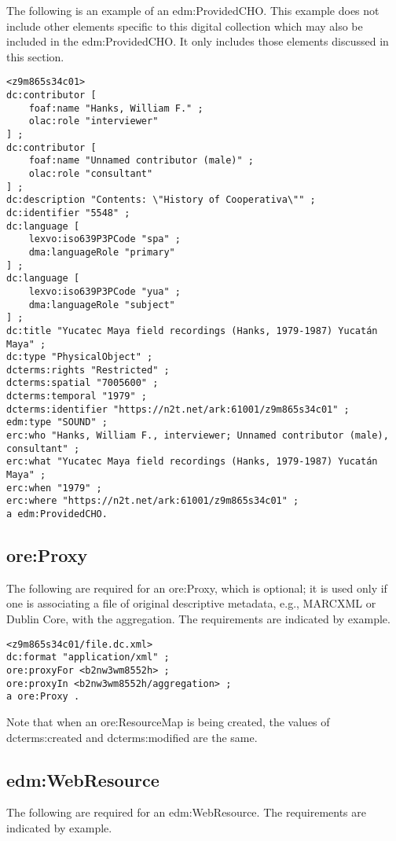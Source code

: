 \documentclass[11pt]{article}
\begin{document}
The following is an example of an edm:ProvidedCHO. This example does not include other elements specific to this digital collection which may also be included in the edm:ProvidedCHO. It only includes those elements discussed in this section.

\begin{verbatim}
<z9m865s34c01>
dc:contributor [
    foaf:name "Hanks, William F." ;
    olac:role "interviewer"
] ;
dc:contributor [
    foaf:name "Unnamed contributor (male)" ;
    olac:role "consultant"
] ;
dc:description "Contents: \"History of Cooperativa\"" ;
dc:identifier "5548" ;
dc:language [
    lexvo:iso639P3PCode "spa" ;
    dma:languageRole "primary"
] ;
dc:language [
    lexvo:iso639P3PCode "yua" ;
    dma:languageRole "subject"
] ;
dc:title "Yucatec Maya field recordings (Hanks, 1979-1987) Yucatán Maya" ;
dc:type "PhysicalObject" ;
dcterms:rights "Restricted" ;
dcterms:spatial "7005600" ;
dcterms:temporal "1979" ;
dcterms:identifier "https://n2t.net/ark:61001/z9m865s34c01" ;
edm:type "SOUND" ;
erc:who "Hanks, William F., interviewer; Unnamed contributor (male), consultant" ;
erc:what "Yucatec Maya field recordings (Hanks, 1979-1987) Yucatán Maya" ;
erc:when "1979" ;
erc:where "https://n2t.net/ark:61001/z9m865s34c01" ;
a edm:ProvidedCHO.
\end{verbatim}

\subsection{ore:Proxy}

The following are required for an ore:Proxy, which is optional; it is used only if one is associating a file of original descriptive metadata, e.g., MARCXML or Dublin Core, with the aggregation. The requirements are indicated by example. 

\begin{verbatim}
<z9m865s34c01/file.dc.xml>
dc:format "application/xml" ;
ore:proxyFor <b2nw3wm8552h> ;
ore:proxyIn <b2nw3wm8552h/aggregation> ;
a ore:Proxy .
\end{verbatim}

Note that when an ore:ResourceMap is being created, the values of dcterms:created and dcterms:modified are the same.

\subsection{edm:WebResource}

The following are required for an edm:WebResource. The requirements are indicated by example.
\end{document}
